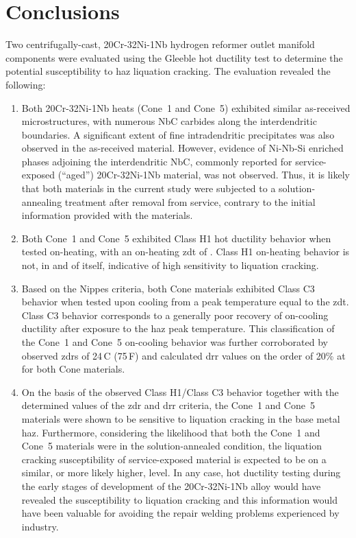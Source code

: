 \chapter{Conclusions} \label{ch:conclusions}
Two centrifugally-cast, 20Cr-32Ni-1Nb hydrogen reformer outlet manifold components were evaluated using the Gleeble\texttrademark{} hot ductility test to determine the potential susceptibility to \gls{haz} liquation cracking.  The evaluation revealed the following:

\begin{enumerate}
\item Both 20Cr-32Ni-1Nb heats (Cone~1 and Cone~5) exhibited similar as-received microstructures, with numerous NbC carbides along the interdendritic boundaries. A significant extent of fine intradendritic precipitates was also observed in the as-received material. However, evidence of Ni-Nb-Si enriched phases adjoining the interdendritic NbC, commonly reported for service-exposed (“aged”) 20Cr-32Ni-1Nb material, was not observed. Thus, it is likely that both materials in the current study were subjected to a solution-annealing treatment after removal from service, contrary to the initial information provided with the materials.
\item Both Cone~1 and Cone~5 exhibited Class H1 hot ductility behavior when tested on-heating, with an on-heating \gls{zdt} of . Class H1 on-heating behavior is not, in and of itself, indicative of high sensitivity to liquation cracking.
\item Based on the Nippes criteria, both Cone materials exhibited Class C3 behavior when tested upon cooling from a peak temperature equal to the \gls{zdt}.  Class C3 behavior corresponds to a generally poor recovery of on-cooling ductility after exposure to the \gls{haz} peak temperature.  This classification of the Cone~1 and Cone~5 on-cooling behavior was further corroborated by observed \gls{zdr}s of 24\,C\textdegree{} (75\,F\textdegree{}) and calculated \gls{drr} values on the order of 20\% at  for both Cone materials.
\item On the basis of the observed Class H1/Class C3 behavior together with the determined values of the \gls{zdr} and \gls{drr} criteria, the Cone~1 and Cone~5 materials were shown to be sensitive to liquation cracking in the base metal \gls{haz}. Furthermore, considering the likelihood that both the Cone~1 and Cone~5 materials were in the solution-annealed condition, the liquation cracking susceptibility of service-exposed material is expected to be on a similar, or more likely higher, level. In any case, hot ductility testing during the early stages of development of the 20Cr-32Ni-1Nb alloy would have revealed the susceptibility to liquation cracking and this information would have been valuable for avoiding the repair welding problems experienced by industry.

\end{enumerate}
